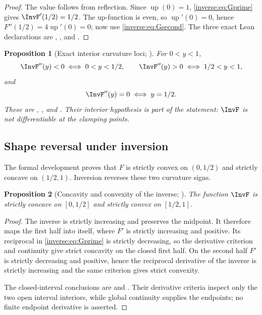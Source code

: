 \documentclass[11pt,oneside]{article}
\newtheorem{proposition}[proposition]{Proposition}
\theoremstyle{definition}
\theoremstyle{remark}
\newcommand{\Up}{\operatorname{up}}
\begin{document}
\begin{proof}
The value follows from reflection.  Since $\Up(0)=1$,
\eqref{inverse:eq:Gprime} gives $\InvF'(1/2)=1/2$.  The up-function is even, so
$\Up'(0)=0$, hence $F''(1/2)=4\Up'(0)=0$; now use
\eqref{inverse:eq:Gsecond}.  The three exact Lean declarations are
, , and
.
\end{proof}

\begin{proposition}[Exact interior curvature loci; \Formalized]
For \(0<y<1\),
\[
 \InvF''(y)<0\iff0<y<1/2,\qquad
 \InvF''(y)>0\iff1/2<y<1,
\]
and
\[
 \InvF''(y)=0\iff y=1/2.
\]
These are ,
, and
.  Their interior hypothesis is
part of the statement: \(\InvF\) is not differentiable at the clamping points.
\end{proposition}

\subsection{Shape reversal under inversion}

The formal development proves that $F$ is strictly convex on
$(0,1/2)$ and strictly concave on $(1/2,1)$.  Inversion reverses these
two curvature signs.

\begin{proposition}[Concavity and convexity of the inverse; \Formalized]
\label{inverse:prop:inverse-shape}
The function $\InvF$ is strictly concave on $[0,1/2]$ and strictly convex
on $[1/2,1]$.
\end{proposition}

\begin{proof}
The inverse is strictly increasing and preserves the midpoint.  It therefore
maps the first half into itself, where $F'$ is strictly increasing and
positive.  Its reciprocal in \eqref{inverse:eq:Gprime} is strictly decreasing, so the
derivative criterion and continuity give strict concavity on the closed first
half.  On the second half $F'$ is strictly decreasing and positive, hence the
reciprocal derivative of the inverse is strictly increasing and the same
criterion gives strict convexity.

The closed-interval conclusions are
 and
.  Their derivative criteria inspect
only the two open interval interiors, while global continuity supplies the
endpoints; no finite endpoint derivative is asserted.
\end{proof}
\end{document}
